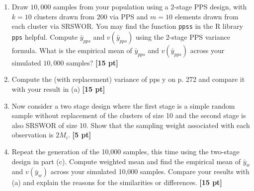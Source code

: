 \documentclass[12pt]{article}
\newcommand{\code}[1]{\texttt{#1}}
\begin{document}
\begin{enumerate}
	\begin{enumerate}[itemsep=5ex]
	\item Draw $10,000$ samples from your population using a $2$-stage PPS design, with $k=10$ clusters drawn from $200$ via PPS and $m=10$ elements drawn from each cluster via SRSWOR.  You may find the function \code{ppss} in the R library \code{pps} helpful.  Compute $\bar y_{pps}$ and $v(\bar y_{pps})$ using the 2-stage PPS variance formula. What is the empirical mean of $\bar y_{pps}$ and $v(\bar y_{pps})$ across your simulated $10,000$ samples? {\bf [15 pt]}
	\item Compute the (with replacement) variance of pps y on p. 272 and compare it with your result in (a) {\bf [15 pt]}
	\item Now consider a two stage design where the first stage is a simple random sample without replacement of the clusters of size 10 and the second stage is also SRSWOR of size 10. Show that the sampling weight associated with each observation is $2 M_i$. {\bf [5 pt]}
	\item Repeat the generation of the 10,000 samples, this time using the two-stage design in part (c). Compute weighted mean and find the empirical mean of $\bar y_{w}$ and $v(\bar y_w)$ across your simulated 10,000 samples. Compare your results with (a) and explain the reasons for the similarities or differences. {\bf [15 pt]}
	\end{enumerate}

\end{enumerate}
\end{document}
